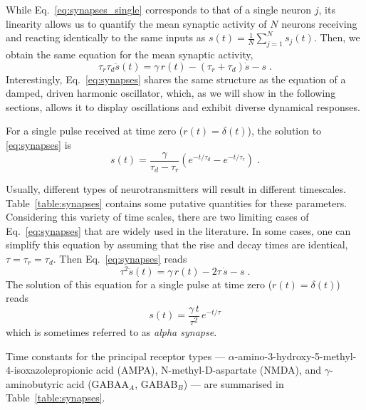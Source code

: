 \documentclass[12pt]{article}
\numberwithin{equation}{section}
\begin{document}
While Eq.~\eqref{eq:synapses_single} corresponds to that of a single neuron $j$, its linearity allows us to  quantify the mean synaptic activity of $N$ neurons receiving and reacting identically to the same inputs as
$
s(t)=\frac{1}{N}\sum_{j=1}^N s_j(t)
$.
Then, we obtain the same equation for the mean synaptic activity,
\begin{equation}\label{eq:synapses}
    \tau_r\tau_d\ddot s(t)= \gamma \, r(t) - (\tau_r+\tau_d) \dot s -s\;.
\end{equation}
Interestingly, Eq.~\eqref{eq:synapses} shares the same structure as the equation of a damped, driven harmonic oscillator, which, as we will show in the following sections, allows it to display oscillations and exhibit diverse dynamical responses.

For a single pulse received at time zero ($r(t)=\delta(t)$), the solution to \eqref{eq:synapses} is
\begin{equation}
s(t)=\frac{\gamma}{\tau_d-\tau_r}\left( e^{-t/\tau_d} - e^{-t/\tau_r}\right)\;.
\end{equation}

Usually, different types of neurotransmitters will result in different timescales.
Table~\ref{table:synapses} contains some putative quantities for these parameters.
Considering this variety of time scales, 
there are two limiting cases of Eq.~\eqref{eq:synapses} that are widely used in the literature.
In some cases, one can simplify this equation by assuming that the rise
and decay times are identical, $\tau=\tau_r=\tau_d$. 
Then Eq.~\ref{eq:synapses} reads
\begin{equation}\label{eq:synapses_2nd}
    \tau^2\ddot s(t)= \gamma \,  r(t) - 2\tau \, \dot s -s\;.
\end{equation}
The solution of this equation for a single pulse at time zero ($r(t)=\delta(t)$)
reads
\begin{equation}
s(t)=\frac{\gamma \, t}{\tau^2}\, e^{-t/\tau}
\end{equation}
which is sometimes referred to as \emph{alpha synapse}.   


Time constants for the principal receptor types — $\alpha$-amino-3-hydroxy-5-methyl-4-isoxazolepropionic acid (AMPA), N-methyl-D-aspartate (NMDA), and $\gamma$-aminobutyric acid (GABAA$_A$, GABAB$_B$) — are summarised in Table~\ref{table:synapses}.

\end{document}
